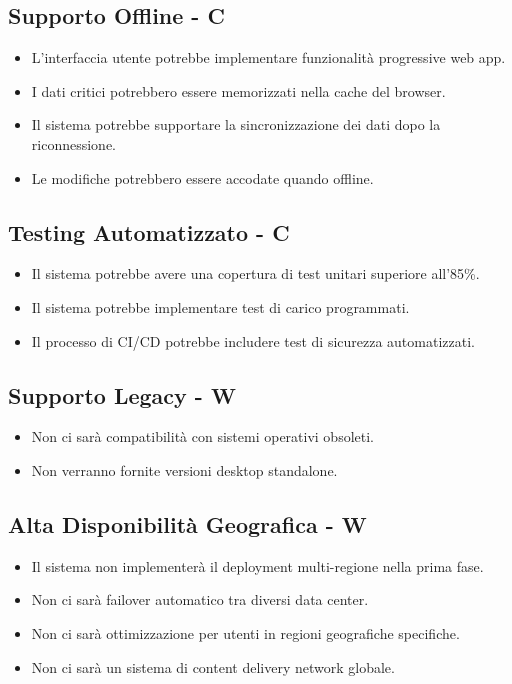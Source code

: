 \documentclass[12pt,a4paper,oneside]{report}
\begin{document}
\subsection{Supporto Offline - C}

\begin{itemize}
    \item L'interfaccia utente potrebbe implementare funzionalità progressive web app.
    \item I dati critici potrebbero essere memorizzati nella cache del browser.
    \item Il sistema potrebbe supportare la sincronizzazione dei dati dopo la riconnessione.
    \item Le modifiche potrebbero essere accodate quando offline.
\end{itemize}

\subsection{Testing Automatizzato - C}

\begin{itemize}
    \item Il sistema potrebbe avere una copertura di test unitari superiore all'85\%.
    \item Il sistema potrebbe implementare test di carico programmati.
    \item Il processo di CI/CD potrebbe includere test di sicurezza automatizzati.
\end{itemize}

\subsection{Supporto Legacy - W}

\begin{itemize}
    \item Non ci sarà compatibilità con sistemi operativi obsoleti.
    \item Non verranno fornite versioni desktop standalone.
\end{itemize}

\subsection{Alta Disponibilità Geografica - W}

\begin{itemize}
    \item Il sistema non implementerà il deployment multi-regione nella prima fase.
    \item Non ci sarà failover automatico tra diversi data center.
    \item Non ci sarà ottimizzazione per utenti in regioni geografiche specifiche.
    \item Non ci sarà un sistema di content delivery network globale.
\end{itemize}
\end{document}
